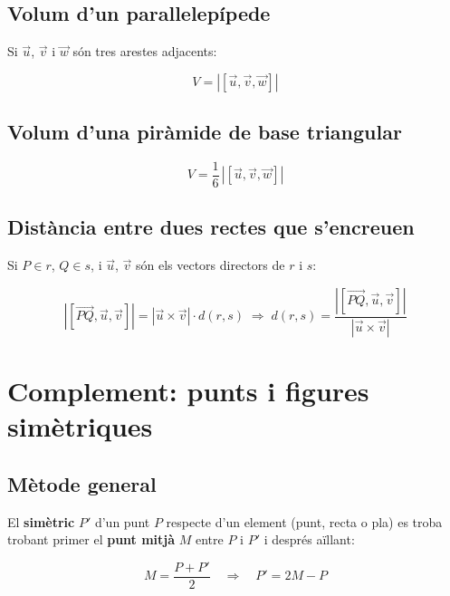 \subsection{Volum d'un paral\textperiodcentered{}lelepípede}

Si $\vec u$, $\vec v$ i $\vec w$ són tres arestes adjacents:

\begin{equation*}
V = |[\vec u, \vec v, \vec w]|
\end{equation*}

\subsection{Volum d'una piràmide de base triangular}

\begin{equation*}
V = \frac16\,|[\vec u, \vec v, \vec w]|
\end{equation*}

\subsection{Distància entre dues rectes que s'encreuen}

Si $P \in r$, $Q \in s$, i $\vec u$, $\vec v$ són els vectors directors de $r$ i $s$:

\begin{equation*}
|[\overrightarrow{PQ}, \vec u, \vec v]| = |\vec u\times\vec v|\cdot d(r, s) \;\Longrightarrow\; d(r, s) = \frac{|[\overrightarrow{PQ}, \vec u, \vec v]|}{|\vec u\times\vec v|}
\end{equation*}

\section{Complement: punts i figures simètriques}

\subsection{Mètode general}

El \textbf{simètric} $P'$ d'un punt $P$ respecte d'un element (punt, recta o pla) es troba trobant primer el \textbf{punt mitjà} $M$ entre $P$ i $P'$ i després aïllant:

\begin{equation*}
M=\frac{P+P'}{2}\quad\Longrightarrow\quad P'=2M-P
\end{equation*}

